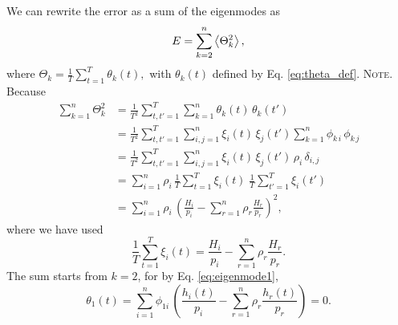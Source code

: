 \documentclass[preprint, floatfix]{revtex4-1}
\newcommand{\note}[1]{{\color{DarkGreen}\footnotesize \textsc{Note.} #1}}
\begin{document}
We can rewrite the error as
a sum of the eigenmodes as
%
\begin{align}
  E
  =
  \sum_{ k = 2 }^n
    \left\langle
      \Theta_k^2
    \right\rangle
  ,
\notag
\end{align}
%
where
%
$
  \Theta_k
  =
  \frac{ 1 } { T }
  \sum_{ t = 1 } ^ T
    \theta_k( t )
  ,
$
%
with $\theta_k(t)$ defined by Eq. \eqref{eq:theta_def}.
%
\note{Because
%
\begin{align*}
  \sum_{ k = 1 }^n
    \Theta_k^2
  &=
  \frac{ 1 } { T^2 }
  \sum_{ t, t' = 1 }^T
    \sum_{ k = 1 }^n
      \theta_k( t ) \, \theta_k( t' )
  \\
  &=
  \frac{ 1 } { T^2 }
  \sum_{ t, t' = 1 }^T
    \sum_{ i, j = 1 }^n
      \xi_i(t) \, \xi_j(t')
      \sum_{ k = 1 }^n
        \phi_{k \, i} \, \phi_{k \, j}
  \\
  &=
  \frac{ 1 } { T^2 }
  \sum_{ t, t' = 1 }^T
    \sum_{ i, j = 1 }^n
      \xi_i(t) \, \xi_j(t') \,
      \rho_i \, \delta_{i, j}
  \\
  &=
  \sum_{ i = 1 }^n
  \rho_i \,
  \frac{ 1 } { T }
  \sum_{ t = 1 }^T \xi_i(t)
  \;
  \frac{ 1 } { T }
  \sum_{ t' = 1 }^T \xi_i(t')
  \\
  &=
  \sum_{ i = 1 }^n
    \rho_i \,
      \left(
        \frac{ H_i }
             { p_i }
        -
        \sum_{r = 1}^n \rho_r
        \frac{ H_r }
             { p_r }
      \right)^2
  ,
\end{align*}
where we have used
$$
  \frac{1}{T}
  \sum_{t = 1}^T \xi_i(t)
  =
  \frac{ H_i }
       { p_i }
  -
  \sum_{r = 1}^n \rho_r
  \frac{ H_r }
       { p_r }
  .
$$
}%
The sum starts from $k = 2$, for
by Eq. \eqref{eq:eigenmode1}, %
$$
\theta_1(t)
=
\sum_{ i = 1 }^n
  \phi_{1i} \, \left(
    \frac{ h_i(t) } { p_i }
    -
    \sum_{r = 1}^n
    \rho_r
    \frac{ h_r(t) } { p_r }
  \right)
= 0.
$$
\end{document}
